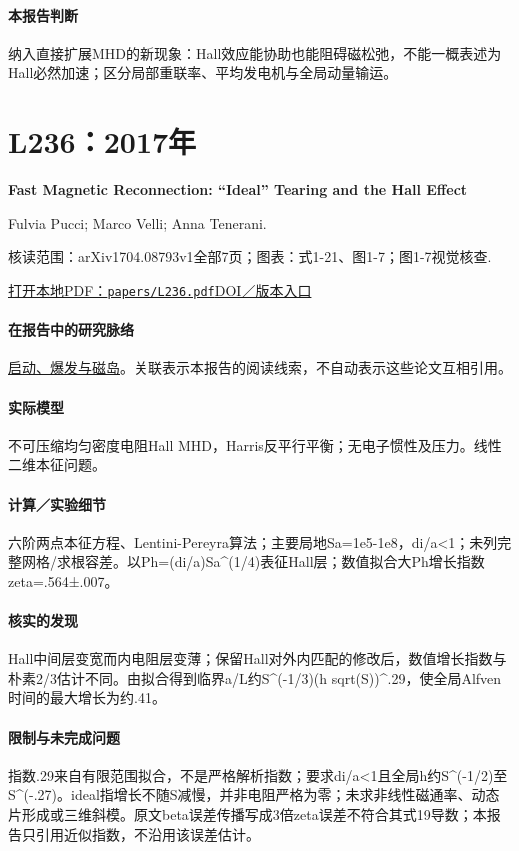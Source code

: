 \paragraph{本报告判断}纳入直接扩展MHD的新现象：Hall效应能协助也能阻碍磁松弛，不能一概表述为Hall必然加速；区分局部重联率、平均发电机与全局动量输运。

\section{L236：2017年}\label{paper:L236}

\textbf{Fast Magnetic Reconnection: “Ideal” Tearing and the Hall Effect}\citep{L236}\

Fulvia Pucci;  Marco Velli;  Anna Tenerani.

\textsf{核读范围：}arXiv1704.08793v1全部7页；\textsf{图表：}式1-21、图1-7；图1-7视觉核查.

\href{run:papers/L236.pdf}{打开本地PDF：\texttt{papers/L236.pdf}}\quad\href{https://doi.org/10.3847/1538-4357/aa7b82}{DOI／版本入口}

\paragraph{在报告中的研究脉络}\hyperref[story:onset]{启动、爆发与磁岛}。关联表示本报告的阅读线索，不自动表示这些论文互相引用。

\paragraph{实际模型}不可压缩均匀密度电阻Hall MHD，Harris反平行平衡；无电子惯性及压力。线性二维本征问题。

\paragraph{计算／实验细节}六阶两点本征方程、Lentini-Pereyra算法；主要局地Sa=1e5-1e8，di/a<1；未列完整网格/求根容差。以Ph=(di/a)Sa\textasciicircum{}(1/4)表征Hall层；数值拟合大Ph增长指数zeta=.564±.007。

\paragraph{核实的发现}Hall中间层变宽而内电阻层变薄；保留Hall对外内匹配的修改后，数值增长指数与朴素2/3估计不同。由拟合得到临界a/L约S\textasciicircum{}(-1/3)(h sqrt(S))\textasciicircum{}.29，使全局Alfven时间的最大增长为约.41。

\paragraph{限制与未完成问题}指数.29来自有限范围拟合，不是严格解析指数；要求di/a<1且全局h约S\textasciicircum{}(-1/2)至S\textasciicircum{}(-.27)。ideal指增长不随S减慢，并非电阻严格为零；未求非线性磁通率、动态片形成或三维斜模。原文beta误差传播写成3倍zeta误差不符合其式19导数；本报告只引用近似指数，不沿用该误差估计。

